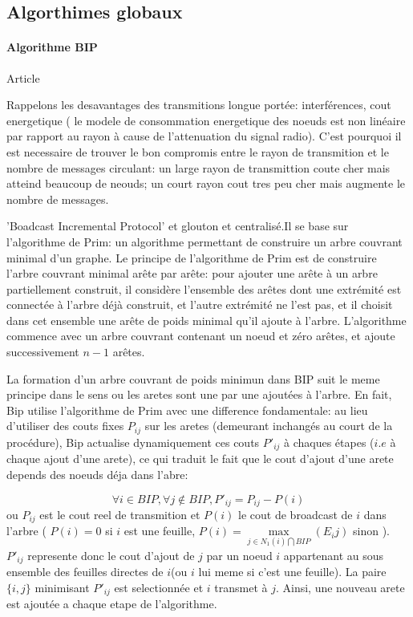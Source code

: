 \subsection{Algorthimes globaux}
\paragraph{Algorithme BIP}
Article \cite{Wieselthier2000}

  Rappelons les desavantages des transmitions longue portée: interférences, cout energetique ( le modele de consommation energetique des noeuds est non linéaire par rapport au rayon à cause de l'attenuation du signal radio).
C'est pourquoi il est necessaire de trouver le bon compromis entre le rayon de transmition et le nombre de messages circulant: un large rayon de transmittion coute cher mais atteind beaucoup de neouds; un court rayon cout tres peu cher mais 
augmente le nombre de messages. 

'Boadcast Incremental Protocol' et glouton et centralisé.Il se base sur l'algorithme de Prim: un algorithme permettant de construire un arbre couvrant minimal d'un graphe. Le principe de l'algorithme de Prim est de construire l'arbre couvrant minimal arête par arête: pour ajouter une 
arête à un arbre partiellement construit, il considère l'ensemble des arêtes dont une extrémité est
connectée à l'arbre déjà construit, et l'autre extrémité ne l'est pas, et
il choisit dans cet ensemble une arête de poids minimal qu'il ajoute à l'arbre. L'algorithme commence avec un arbre couvrant contenant un noeud et zéro arêtes, et ajoute successivement $n-1$ arêtes.

La formation d'un arbre couvrant de poids minimun dans BIP suit le meme principe dans le sens ou les aretes sont une par une ajoutées à l'arbre.
En fait, Bip utilise l'algorithme de Prim avec une difference fondamentale: au lieu d'utiliser des couts fixes $P_{ij}$ sur les aretes (demeurant inchangés au court de la procédure),
Bip actualise dynamiquement ces couts $P'_{ij}$ à chaques étapes ($i.e$ à chaque ajout d'une arete), ce qui traduit le fait que le cout d'ajout d'une arete depends des noeuds déja dans l'abre:

$$ \forall i \in BIP, \forall j \notin BIP, P'_{ij}=P_{ij}-P(i)$$
ou $P_{ij}$ est le cout reel de transmition et $P(i)$ le cout de broadcast de $i$ dans l'arbre ( $P(i)=0$ si $i$ est une feuille, $P(i)=\max\limits_{j\in N_1(i)\bigcap BIP}(E_ij)$ sinon ). $P'_{ij}$ represente donc le cout d'ajout de $j$ par un noeud $i$ appartenant au sous ensemble des feuilles
directes de $i$(ou $i$ lui meme si c'est une feuille). La paire $\{i,j\}$ minimisant $P'_{ij}$ est selectionnée et $i$ transmet à $j$. Ainsi, une nouveau arete est ajoutée a chaque etape de l'algorithme.\\



